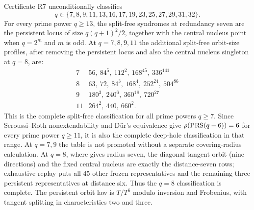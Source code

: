 \begin{theorem}
\label{thm:r7}%
%
%
%
%
%
Certificate R7 unconditionally classifies
\[
q\in\{7,8,9,11,13,16,17,19,23,25,27,29,31,32\}.
\]
For every prime power $q\geq13$,
the split-free syndromes
at redundancy seven are the persistent locus of size
\(q(q+1)^2/2\), together with the
central nucleus point when $q=2^m$ and $m$ is odd.  At $q=7,8,9,11$ the additional
split-free orbit-size profiles, after removing the persistent locus
and also the central nucleus singleton at \(q=8\), are:
\[
\begin{array}{c|l}
7&56,\ 84^5,\ 112^2,\ 168^{45},\ 336^{141}\\
8&63,\ 72,\ 84^3,\ 168^4,\ 252^{24},\ 504^{86}\\
9&180^3,\ 240^6,\ 360^{18},\ 720^{27}\\
11&264^2,\ 440,\ 660^2 .
\end{array}
\]
This is the complete split-free classification for all prime powers
\(q\geq7\). Since
Seroussi--Roth nonextendability and Dür's equivalence give
\(\rho(\operatorname{PRS}(q-6))=6\) for every prime power \(q\geq11\), it is also
the complete deep-hole classification in that
range.  At $q=7,9$ the table is not promoted without a separate
covering-radius calculation.  At $q=8$, where
\cite[Thm.~17(1)]{WuDingChen2023} gives radius seven, the diagonal tangent
orbit (nine directions) and the fixed central nucleus are exactly the
distance-seven rows; exhaustive replay puts all 45 other frozen representatives
and the remaining three persistent representatives at distance six. Thus the
$q=8$ classification is complete. The
persistent orbit law is $T/T^6$ modulo inversion and Frobenius, with
tangent splitting in characteristics two and three.
\end{theorem}

